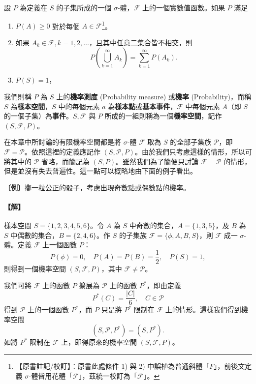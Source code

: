 設 $P$ 為定義在 $S$ 的子集所成的一個 $\sigma$-體，$\mathscr{F}$ 上的一個實數值函數。如果 $P$ 滿足
\begin{enumerate}[label=\arabic*)]
  \item $P(A) \ge 0$ 對於每個 $A \in \mathscr{F}$\label{note:b5s-ch4-p138-f-font}\footnote{【原書註記/校訂】：原書此處條件 1) 與 2) 中誤植為普通斜體「$F$」，前後文定義 $\sigma$-體皆用花體「$\mathscr{F}$」，茲統一校訂為「$\mathscr{F}$」。}。
  \item 如果 $A_k \in \mathscr{F}, k = 1, 2, \dots$，且其中任意二集合皆不相交，則
  \[
  P\left( \bigcup_{k=1}^\infty A_k \right) = \sum_{k=1}^\infty P(A_k).
  \]
  \item $P(S) = 1$，
\end{enumerate}
我們則稱 $P$ 為 $S$ 上的\textbf{機率測度} (Probability measure) 或\textbf{機率} (Probability)，而稱 $S$ 為\textbf{樣本空間}，$S$ 中的每個元素 $a$ 為\textbf{樣本點}或\textbf{基本事件}，$\mathscr{F}$ 中每個元素 $A$（即 $S$ 的一個子集）為\textbf{事件}。$S, \mathscr{F}$ 與 $P$ 所成的一組則稱為一個\textbf{機率空間}，記作 $(S, \mathscr{F}, P)$。

在本章中所討論的有限機率空間都是將 $\sigma$-體 $\mathscr{F}$ 取為 $S$ 的全部子集族 $\mathscr{P}$，即 $\mathscr{F} = \mathscr{P}$。依照這裡的定義應記作 $(S, \mathscr{P}, P)$。由於我們只考慮這樣的情形，所以可將其中的 $\mathscr{P}$ 省略，而簡記為 $(S, P)$。雖然我們為了簡便只討論 $\mathscr{F} = \mathscr{P}$ 的情形，但是並沒有失去普遍性。這一點可以概略地由下面的例子看出。

\medskip
\noindent\textbf{〔例〕}\quad 擲一粒公正的骰子，考慮出現奇數點或偶數點的機率。
\paragraph{【解】}
樣本空間 $S = \{1, 2, 3, 4, 5, 6\}$。令 $A$ 為 $S$ 中奇數的集合，$A = \{1, 3, 5\}$，及 $B$ 為 $S$ 中偶數的集合，$B = \{2, 4, 6\}$。作 $S$ 的子集族 $\mathscr{F} = \{\phi, A, B, S\}$，則 $\mathscr{F}$ 成一 $\sigma$-體。定義 $\mathscr{F}$ 上一個函數 $P$：
\[
P(\phi) = 0, \quad P(A) = P(B) = \frac{1}{2}, \quad P(S) = 1,
\]
則得到一個機率空間 $(S, \mathscr{F}, P)$，其中 $\mathscr{F} \neq \mathscr{P}$。

我們可將 $\mathscr{F}$ 上的函數 $P$ 擴展為 $\mathscr{P}$ 上的函數 $P^*$，即由定義
\[
P^*(C) = \frac{|C|}{6}, \quad C \in \mathscr{P}
\]
得到 $\mathscr{P}$ 上的一個函數 $P^*$，而 $P$ 只是將 $P^*$ 限制在 $\mathscr{F}$ 上的情形。這樣我們得到機率空間
\[
(S, \mathscr{P}, P^*) = (S, P^*).
\]
如將 $P^*$ 限制在 $\mathscr{F}$ 上，即得原來的機率空間 $(S, \mathscr{F}, P)$。

